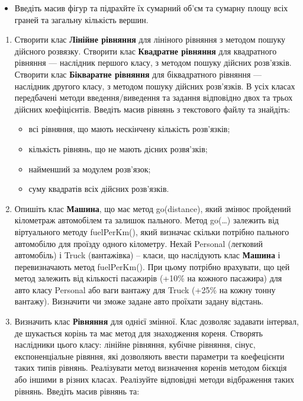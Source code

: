 \documentclass[]{article}
\begin{document}
\begin{itemize}
\item
  Введіть масив фігур та підрахйте їх сумарний об'єм та сумарну площу
  всіх граней та загальну кількість вершин.
\end{itemize}

\begin{enumerate}
\def\labelenumi{\arabic{enumi}.}
\item
  Створити клас \textbf{Лінійне рівняння} для лініного рівняння з
  методом пошуку дійсного розвязку. Створити клас \textbf{Квадратне
  рівняння} для квадратного рівняння --- наслідник першого класу, з
  методом пошуку дійсних розв'язків. Створити клас \textbf{Бікваратне
  рівняння} для біквадратного рівняння --- наслідник другого класу, з
  методом пошуку дійсних розв'язків. В усіх класах передбачені методи
  введення/виведення та задання відповідно двох та трьох дійсних
  коефіцієнтів. Введіть масив рівнянь з текстового файлу та знайдіть:

  \begin{itemize}
  \item
    всі рівняння, що мають нескінчену кількість розв'язків;
  \item
    кількість рівнянь, що не мають дісних розвя'зків;
  \item
    найменший за модулем розв'язок;
  \item
    суму квадратів всіх дійсних розв'язків.
  \end{itemize}
\item
  Опишіть клас \textbf{Машина}, що має метод go(distance), який змінює
  пройдений кілометраж автомобілем та залишок пального. Метод
  go(\ldots{}) залежить від віртуального методу fuelPerKm(), який
  визначає скільки потрібно пального автомобілю для проїзду одного
  кілометру. Нехай Personal (легковий автомобіль) і Truck (вантажівка)
  -- класи, що наслідують клас \textbf{Машина} і перевизначають метод
  fuelPerKm(). При цьому потрібно врахувати, що цей метод залежить від
  кількості пасажирів (+10\% на кожного пасажира) для авто класу
  Personal або ваги вантажу для Truck (+25\% на кожну тонну вантажу).
  Визначити чи зможе задане авто проїхати задану відстань.
\item
  Визначить клас \textbf{Рівняння} для однієї змінної. Клас дозволяє
  задавати інтервал, де шукається корінь та має метод для знаходження
  кореня. Створять наслідники цього класу: лінійне рівняння, кубічне
  рівняння, сінус, експоненціальне рівяння, які дозволяють ввести
  параметри та коефецієнти таких типів рівнянь. Реалізувати метод
  визначення коренів методом бієкція або іншими в різних класах.
  Реалізуйте відповідні методи відбраження таких рівнянь. Введіть масив
  рівнянь та:


\end{enumerate}
\end{document}
